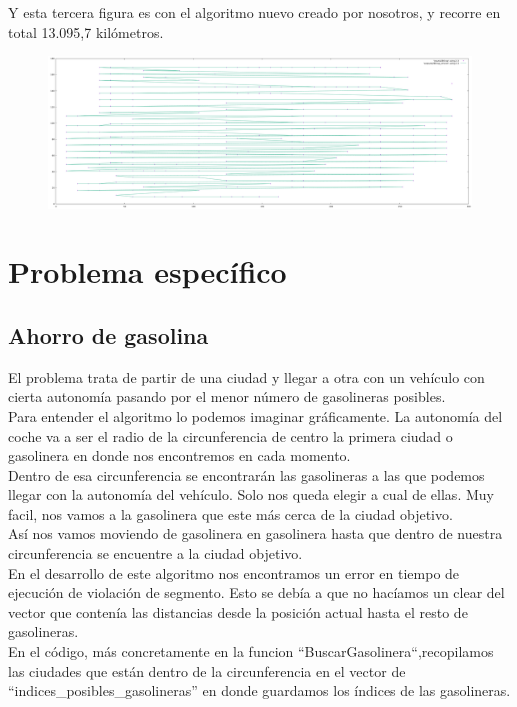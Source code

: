 \documentclass[11pt,a4paper]{article} %
\begin{document}
Y esta tercera figura es con el algoritmo nuevo creado por nosotros, y recorre en total 13.095,7 kilómetros.
\begin{figure}[H]
	\centering
	\includegraphics[width=13cm]{data/graphics/otro/otro_280.pdf}
\end{figure}


\newpage
\section{Problema específico}
\subsection{Ahorro de gasolina}
El problema trata de partir de una ciudad y llegar a otra con un vehículo con cierta autonomía pasando por el menor número de gasolineras posibles.\\

Para entender el algoritmo lo podemos imaginar gráficamente. La autonomía del coche va a ser el radio de la circunferencia de centro la primera ciudad o gasolinera en donde nos encontremos en cada momento.\\

Dentro de esa circunferencia se encontrarán las gasolineras a las que podemos llegar con la autonomía del vehículo. Solo nos queda elegir a cual de ellas. Muy facil, nos vamos a la gasolinera que este más cerca de la ciudad objetivo. \\

Así nos vamos moviendo de gasolinera en gasolinera hasta que dentro de nuestra circunferencia se encuentre a la ciudad objetivo.\\

En el desarrollo de este algoritmo nos encontramos un error en tiempo de ejecución de violación de segmento. Esto se debía a que no hacíamos un clear del vector que contenía las distancias desde la posición actual hasta el resto de gasolineras.\\

En el código, más concretamente en la funcion “BuscarGasolinera“,recopilamos las ciudades que están dentro de la circunferencia en el vector de “indices\_posibles\_gasolineras” en donde guardamos los índices de las gasolineras.\\
\end{document}
